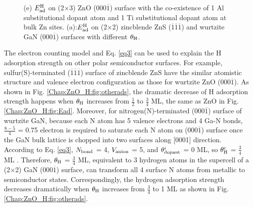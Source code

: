 \begingroup
\begin{figure}[!ht]
  \centering
  \label{Chap:ZnO_H:fig:2dop}
  \label{Chap:ZnO_H:fig:otherads}
\caption{(e) $E_{\textup{ad}}^{\textup{H}}$ on (2$\times$3) ZnO (000$\overline{1}$) surface with the co-existence of 1 Al substitutional dopant atom and 1 Ti substitutional dopant atom at bulk Zn sites. (a):$E_{\textup{ad}}^{\textup{H}}$ on (2$\times$2) zincblende ZnS ($\overline{1}$$\overline{1}$$\overline{1}$) and wurtzite GaN (000$\overline{1}$) surfaces with different $\theta_{\textup{H}}$. }
  \label{Chap:ZnO_H:fig:others}
\end{figure}
\endgroup

The electron counting model and Eq. \ref{eq3} can be used to explain the H adsorption strength on other polar semiconductor surfaces. For example, sulfur(S)-terminated ($\overline{1}$$\overline{1}$$\overline{1}$) surface of zincblende ZnS have the similar atomistic structure and valence electron configuration as those for wurtzite ZnO (000$\overline{1}$). As shown in Fig. \ref{Chap:ZnO_H:fig:otherads}, the dramatic decrease of H adsorption strength happens when $\theta_{\textup{H}}$ increases from $\frac{1}{2}$ to $\frac{3}{4}$ ML, the same as ZnO in Fig. \ref{Chap:ZnO_H:fig:Ead}. Moreover, for nitrogen(N)-terminated (000$\overline{1}$) surface of wurtzite GaN, because each N atom has 5 valence electrons and 4 Ga-N bonds, $\frac{8-5}{4}$ = 0.75 electron is required to saturate each N atom on (000$\overline{1}$) surface once the GaN bulk lattice is chopped into two surfaces along [0001] direction. According to Eq. \ref{eq3}, $N_{\textup{bond}}$ = 4, $V_{\textup{anion}}$ = 5, and $\theta_{\textup{dopant}}^i$ = 0 ML, so $\theta_{\textup{H}}^{\textup{c}}$ = $\frac{3}{4}$ ML . Therefore, $\theta_{\textup{H}}$ = $\frac{3}{4}$ ML, equivalent to 3 hydrogen atoms in the supercell of a (2$\times$2) GaN (000$\overline{1}$) surface, can transform all 4 surface N atoms from metallic to semiconductor states. Correspondingly, the hydrogen adsorption strength decreases dramatically when $\theta_{\textup{H}}$ increases from $\frac{3}{4}$ to 1 ML as shown in Fig. \ref{Chap:ZnO_H:fig:otherads}. 

